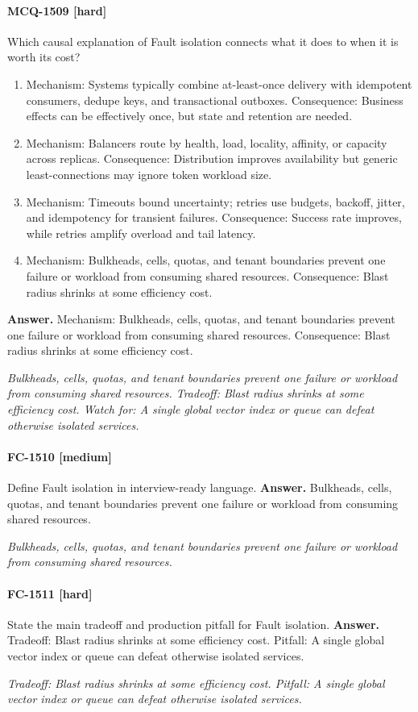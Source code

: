 \paragraph{MCQ-1509 [hard]} Which causal explanation of Fault isolation connects what it does to when it is worth its cost?
\begin{enumerate}[label=\Alph*.]
\item Mechanism: Systems typically combine at-least-once delivery with idempotent consumers, dedupe keys, and transactional outboxes. Consequence: Business effects can be effectively once, but state and retention are needed.
\item Mechanism: Balancers route by health, load, locality, affinity, or capacity across replicas. Consequence: Distribution improves availability but generic least-connections may ignore token workload size.
\item Mechanism: Timeouts bound uncertainty; retries use budgets, backoff, jitter, and idempotency for transient failures. Consequence: Success rate improves, while retries amplify overload and tail latency.
\item Mechanism: Bulkheads, cells, quotas, and tenant boundaries prevent one failure or workload from consuming shared resources. Consequence: Blast radius shrinks at some efficiency cost.
\end{enumerate}
\noindent\textbf{Answer.} Mechanism: Bulkheads, cells, quotas, and tenant boundaries prevent one failure or workload from consuming shared resources. Consequence: Blast radius shrinks at some efficiency cost.
\par\textit{Bulkheads, cells, quotas, and tenant boundaries prevent one failure or workload from consuming shared resources. Tradeoff: Blast radius shrinks at some efficiency cost. Watch for: A single global vector index or queue can defeat otherwise isolated services.}
\paragraph{FC-1510 [medium]} Define Fault isolation in interview-ready language.
\noindent\textbf{Answer.} Bulkheads, cells, quotas, and tenant boundaries prevent one failure or workload from consuming shared resources.
\par\textit{Bulkheads, cells, quotas, and tenant boundaries prevent one failure or workload from consuming shared resources.}
\paragraph{FC-1511 [hard]} State the main tradeoff and production pitfall for Fault isolation.
\noindent\textbf{Answer.} Tradeoff: Blast radius shrinks at some efficiency cost. Pitfall: A single global vector index or queue can defeat otherwise isolated services.
\par\textit{Tradeoff: Blast radius shrinks at some efficiency cost. Pitfall: A single global vector index or queue can defeat otherwise isolated services.}
